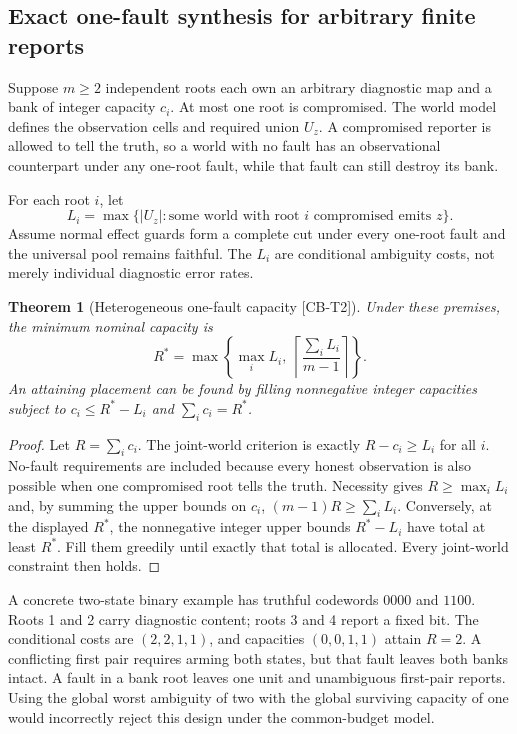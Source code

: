 \documentclass[11pt,a4paper]{article}
\newtheorem{theorem}{Theorem}
\theoremstyle{definition}\newtheorem{definition}{Definition}
\newcommand{\sid}[1]{\textnormal{\textsf{[#1]}}}
\newcommand{\ceil}[1]{\left\lceil #1\right\rceil}
\newcommand{\Rmin}{R^*}
\begin{document}
\subsection{Exact one-fault synthesis for arbitrary finite reports}
Suppose $m\geq2$ independent roots each own an arbitrary diagnostic map and a bank of integer capacity $c_i$. At most one root is compromised. The world model defines the observation cells and required union $U_z$. A compromised reporter is allowed to tell the truth, so a world with no fault has an observational counterpart under any one-root fault, while that fault can still destroy its bank.

For each root $i$, let
\begin{equation}
L_i=\max\{|U_z|:\text{some world with root }i\text{ compromised emits }z\}.
\end{equation}
Assume normal effect guards form a complete cut under every one-root fault and the universal pool remains faithful. The $L_i$ are conditional ambiguity costs, not merely individual diagnostic error rates.

\begin{theorem}[Heterogeneous one-fault capacity \sid{CB-T2}]
\label{thm:hetero}
Under these premises, the minimum nominal capacity is
\begin{equation}
\boxed{\Rmin=\max\left\{\max_i L_i,\;\ceil{\frac{\sum_i L_i}{m-1}}\right\}.}
\label{eq:hetero}
\end{equation}
An attaining placement can be found by filling nonnegative integer capacities subject to $c_i\leq\Rmin-L_i$ and $\sum_i c_i=\Rmin$.
\end{theorem}
\begin{proof}
Let $R=\sum_i c_i$. The joint-world criterion is exactly $R-c_i\geq L_i$ for all $i$. No-fault requirements are included because every honest observation is also possible when one compromised root tells the truth. Necessity gives $R\geq\max_iL_i$ and, by summing the upper bounds on $c_i$, $(m-1)R\geq\sum_iL_i$. Conversely, at the displayed $\Rmin$, the nonnegative integer upper bounds $\Rmin-L_i$ have total at least $\Rmin$. Fill them greedily until exactly that total is allocated. Every joint-world constraint then holds.
\end{proof}
A concrete two-state binary example has truthful codewords $0000$ and $1100$. Roots 1 and 2 carry diagnostic content; roots 3 and 4 report a fixed bit. The conditional costs are $(2,2,1,1)$, and capacities $(0,0,1,1)$ attain $R=2$. A conflicting first pair requires arming both states, but that fault leaves both banks intact. A fault in a bank root leaves one unit and unambiguous first-pair reports. Using the global worst ambiguity of two with the global surviving capacity of one would incorrectly reject this design under the common-budget model.
\end{document}
